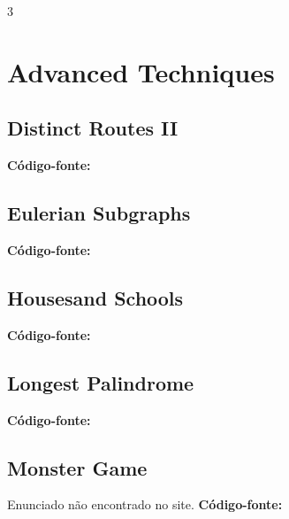 \documentclass[8pt]{extarticle}
\begin{document}
\begin{multicols*}{3}

\section{Advanced Techniques}

\subsection{Distinct Routes II}
\begin{caixaenunciado}

\end{caixaenunciado}
\vspace{0.3cm}
\noindent\textbf{Código-fonte:}


\subsection{Eulerian Subgraphs}
\begin{caixaenunciado}

\end{caixaenunciado}
\vspace{0.3cm}
\noindent\textbf{Código-fonte:}


\subsection{Housesand Schools}
\begin{caixaenunciado}

\end{caixaenunciado}
\vspace{0.3cm}
\noindent\textbf{Código-fonte:}


\subsection{Longest Palindrome}
\begin{caixaenunciado}

\end{caixaenunciado}
\vspace{0.3cm}
\noindent\textbf{Código-fonte:}


\subsection{Monster Game}
Enunciado não encontrado no site.
\vspace{0.3cm}
\noindent\textbf{Código-fonte:}



\end{multicols*}
\end{document}
